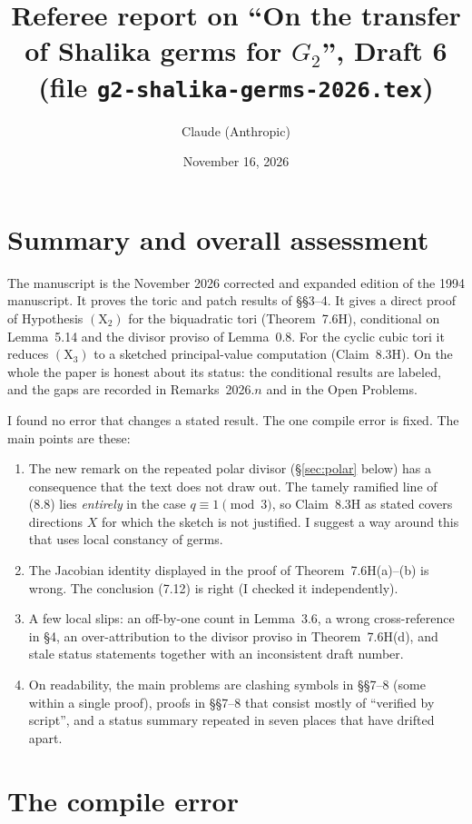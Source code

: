 \documentclass[12pt,letterpaper]{amsart}
\title[Referee report: Shalika germs for $G_2$, Draft 6]{Referee report on ``On the transfer of Shalika germs for $G_2$'', Draft 6 (file \texttt{g2-shalika-germs-2026.tex})}
\author{Claude (Anthropic)}
\date{November 16, 2026}
\begin{document}
\maketitle

\section{Summary and overall assessment}

The manuscript is the November 2026 corrected and expanded edition of the 1994
manuscript. It proves the toric and patch results of \S\S3--4. It gives a
direct proof of Hypothesis $(\mathrm X_2)$ for the biquadratic tori
(Theorem~7.6H), conditional on Lemma~5.14 and the divisor proviso of
Lemma~0.8. For the cyclic cubic tori it reduces $(\mathrm X_3)$ to a sketched
principal-value computation (Claim~8.3H). On the whole the paper is honest
about its status: the conditional results are labeled, and the gaps are
recorded in Remarks~2026.$n$ and in the Open Problems.

I found no error that changes a stated result. The one compile error is fixed.
The main points are these:
\begin{enumerate}[label=(\roman*)]
\item The new remark on the repeated polar divisor
(\S\ref{sec:polar} below) has a consequence that the text does not draw out.
The tamely ramified line of (8.8) lies \emph{entirely} in the case
$q\equiv1\pmod 3$, so Claim~8.3H as stated covers directions $X$ for which the
sketch is not justified. I suggest a way around this that uses local constancy
of germs.
\item The Jacobian identity displayed in the proof of Theorem~7.6H(a)--(b) is
wrong. The conclusion (7.12) is right (I checked it independently).
\item A few local slips: an off-by-one count in Lemma~3.6, a wrong
cross-reference in \S4, an over-attribution to the divisor proviso in
Theorem~7.6H(d), and stale status statements together with an inconsistent
draft number.
\item On readability, the main problems are clashing symbols in
\S\S7--8 (some within a single proof), proofs in \S\S7--8 that consist mostly
of ``verified by script'', and a status summary repeated in seven places that
have drifted apart.
\end{enumerate}

\section{The compile error}
\end{document}
